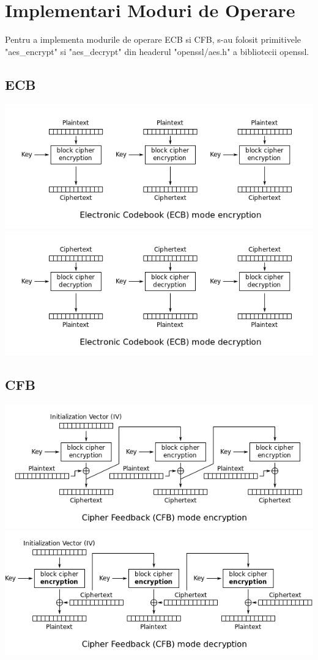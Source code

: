 \documentclass{article}
\begin{document}
\section{Implementari Moduri de Operare}
Pentru a implementa modurile de operare ECB si CFB, s-au folosit primitivele "aes\_encrypt" si "aes\_decrypt" din headerul "openssl/aes.h" a bibliotecii openssl.

\subsection{ECB}
\includegraphics[width=\textwidth,height=\textheight,keepaspectratio]{ECB_Encryption.png} \\
\includegraphics[width=\textwidth,height=\textheight,keepaspectratio]{ECB_Decryption.png} \\

\subsection{CFB}
\includegraphics[width=\textwidth,height=\textheight,keepaspectratio]{CFB_Encryption.png} \\
\includegraphics[width=\textwidth,height=\textheight,keepaspectratio]{CFB_Decryption.png} \\
\end{document}

